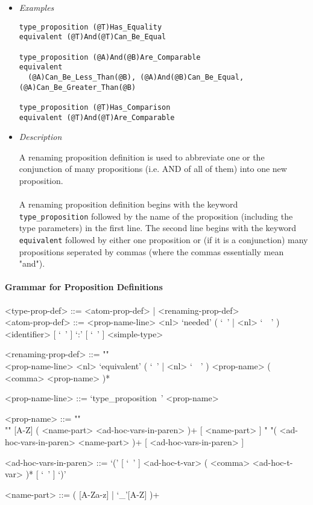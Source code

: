 \documentclass{article}
\begin{document}
\begin{itemize}
\item \textit{Examples}
\begin{verbatim}
type_proposition (@T)Has_Equality
equivalent (@T)And(@T)Can_Be_Equal

type_proposition (@A)And(@B)Are_Comparable
equivalent
  (@A)Can_Be_Less_Than(@B), (@A)And(@B)Can_Be_Equal, (@A)Can_Be_Greater_Than(@B)

type_proposition (@T)Has_Comparison
equivalent (@T)And(@T)Are_Comparable
\end{verbatim}

\item \textit{Description}

A renaming proposition definition is used to abbreviate one or the conjunction
of many propositions (i.e. AND of all of them) into one new proposition.
\\\\
A renaming proposition definition begins with the keyword
\texttt{type_proposition} followed by the name of the proposition (including
the type parameters) in the first line. The second line begins with the keyword
\texttt{equivalent} followed by either one proposition or (if it is a
conjunction) many propositions seperated by commas (where the commas
essentially mean "and").

\end{itemize}

\paragraph{Grammar for Proposition Definitions}

\begin{grammar}
<type-prop-def> ::= <atom-prop-def> | <renaming-prop-def>
\\

<atom-prop-def> ::=
<prop-name-line> <nl> `needed' ( `\ ' | <nl> `\ \ ' )
<identifier> [ `\ ' ] `:' [ `\ ' ] <simple-type>

<renaming-prop-def> ::= ""\\
<prop-name-line> <nl>
`equivalent' ( `\ ' | <nl> `\ \ ' ) <prop-name> ( <comma> <prop-name> )*

<prop-name-line> ::= `type_proposition\ ' <prop-name>

<prop-name> ::=  ""\\""
[A-Z] ( <name-part> <ad-hoc-vars-in-paren> )+ [ <name-part> ]
\alt " "( <ad-hoc-vars-in-paren> <name-part> )+ [ <ad-hoc-vars-in-paren> ]

<ad-hoc-vars-in-paren> ::=
`(' [ `\ ' ] <ad-hoc-t-var> ( <comma> <ad-hoc-t-var> )* [ `\ ' ] `)'

<name-part> ::= ( [A-Za-z] | `_'[A-Z] )+
\end{grammar} 
\end{document}
